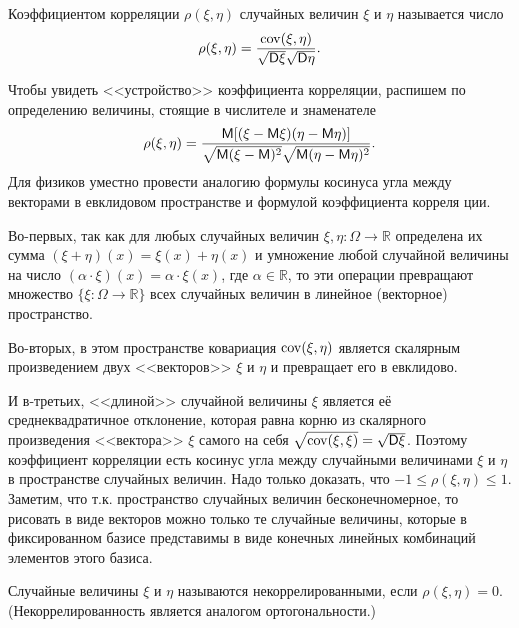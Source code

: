 \begin{definition}
	Коэффициентом корреляции $\rho(\xi, \eta)$ случайных величин $\xi$ и $\eta$ называется число
	\begin{equation*}
		\rho(\xi,\eta)=\frac{\operatorname{cov}(\xi,\eta)}{\sqrt{\mathsf{D}\xi}\sqrt{\mathsf{D}\eta}}.
	\end{equation*}
\end{definition}
\begin{remark}\label{rem:19.8}
	Чтобы увидеть <<устройство>> коэффициента корреляции, распишем по определению величины, стоящие в числителе и знаменателе
	\begin{equation*}
		\rho(\xi, \eta)=\frac{\mathsf{M}[(\xi-\mathsf{M} \xi)(\eta-\mathsf{M}\eta)]}
		{\sqrt{\mathsf{M}(\xi-\mathsf{M})^2}\sqrt{\mathsf{M}(\eta-\mathsf{M}\eta)^2}}.
	\end{equation*}
		Для физиков уместно провести аналогию формулы косинуса угла между
	векторами в евклидовом пространстве и формулой коэффициента корреля	ции.
	
	Во-первых, так как для любых случайных величин 
	$\xi, \eta : \Omega \to \mathbb{R}$ определена их сумма 
	$(\xi +\eta)(x) = \xi(x)+\eta(x)$ и умножение любой случайной величины на число 
	$(\alpha \cdot \xi)(x) = \alpha \cdot \xi(x)$, где $\alpha \in \mathbb{R}$, то эти операции превращают
	множество $\{\xi : \Omega \to \mathbb{R}\}$ всех случайных величин в линейное (векторное)	пространство.
	
	Во-вторых, в этом пространстве ковариация $\operatorname{cov}(\xi, \eta)$ является скалярным произведением двух <<векторов>> $\xi$ и $\eta$ и превращает его в евклидово.

	И в-третьих, <<длиной>> случайной величины $\xi$ является её среднеквадратичное отклонение, которая равна корню из скалярного произведения <<вектора>> $\xi$ самого на себя
	$\sqrt{\operatorname{cov}(\xi, \xi)}=\sqrt{\mathsf{D}\xi}$. Поэтому коэффициент корреляции есть косинус угла между случайными величинами $\xi$ и $\eta$ в пространстве случайных величин. Надо только доказать, что $−1 \leqslant \rho(\xi, \eta) \leqslant 1$. Заметим, что т.к. пространство случайных величин бесконечномерное, то рисовать в виде векторов можно только те случайные величины, которые	в фиксированном базисе представимы в виде конечных линейных комбинаций элементов этого базиса.
\end{remark}

\begin{definition}
	Случайные величины $\xi$ и $\eta$ называются некоррелированными, если $\rho(\xi, \eta) = 0$. (Некоррелированность является аналогом
ортогональности.)
\end{definition}

